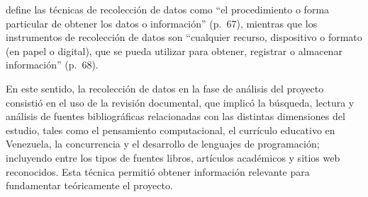 
 define las técnicas de recolección de datos como “el procedimiento o forma particular de obtener los datos o información” (p.~67), mientras que los instrumentos de recolección de datos son “cualquier recurso, dispositivo o formato (en papel o digital), que se pueda utilizar para obtener, registrar o almacenar información” (p.~68).

En este sentido, la recolección de datos en la fase de análisis del proyecto consistió en el uso de la revisión documental, que implicó la búsqueda, lectura y análisis de fuentes bibliográficas relacionadas con las distintas dimensiones del estudio, tales como el pensamiento computacional, el currículo educativo en Venezuela, la concurrencia y el desarrollo de lenguajes de programación; incluyendo entre los tipos de fuentes libros, artículos académicos y sitios web reconocidos. Esta técnica permitió obtener información relevante para fundamentar teóricamente el proyecto.

